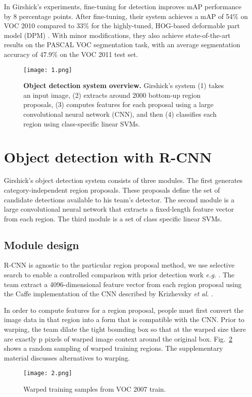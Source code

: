 \documentclass[10pt,twocolumn,letterpaper]{article}
\begin{document}
In Girshick's experiments, fine-tuning for detection improves mAP performance by 8 percentage points. After fine-tuning, their system achieves a mAP of 54\% on VOC 2010 compared to 33\% for the highly-tuned, HOG-based deformable part model (DPM) \cite{Felzenszwalb2010Object}. With minor modifications, they also achieve state-of-the-art results on the PASCAL VOC segmentation task, with an average segmentation accuracy of 47.9\% on the VOC 2011 test set.
\begin{figure}
	\begin{center}
		\texttt{[image: 1.png]}
	\end{center}
	\caption{{\bfseries Object detection system overview.} Girshick's system (1) takes an input image, (2) extracts around 2000 bottom-up region proposals, (3) computes features for each proposal using a large convolutional neural network (CNN), and then (4) classifies each region using class-specific linear SVMs.}
	\label{p1}
\end{figure}

\section{Object detection with R-CNN}

Girshick's object detection system consists of three modules. The first generates category-independent region proposals. These proposals define the set of candidate detections available to his team's detector. The second module is a large convolutional neural network that extracts a fixed-length feature vector from each region. The third module is a set of class specific linear SVMs.

\subsection{Module design}

R-CNN is agnostic to the particular region proposal method, we use selective search to enable a controlled comparison with prior detection work \emph{e.g.} \cite{Uijlings2013Selective,Wang2014Regionlets}. The team extract a 4096-dimensional feature vector from each region proposal using the Caffe implementation of the CNN described by Krizhevsky \emph{et al.} \cite{Krizhevsky2012ImageNet}. 

In order to compute features for a region proposal, people must first convert the image data in that region into a form that is compatible with the CNN. Prior to warping, the team dilate the tight bounding box so that at the warped size there are exactly p pixels of warped image context around the original box. Fig.~\ref{p2} shows a random sampling of warped training regions. The supplementary material discusses alternatives to warping.
\begin{figure}
	\begin{center}
		\texttt{[image: 2.png]}
	\end{center}
	\caption{Warped training samples from VOC 2007 train.}
	\label{p2}
\end{figure}
\end{document}
